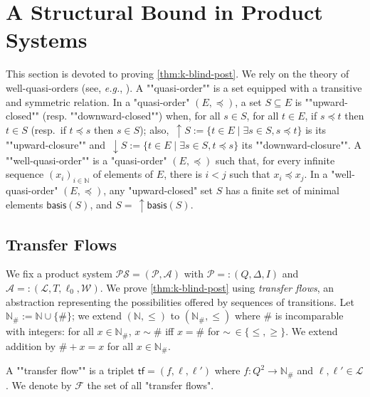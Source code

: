 \documentclass[10pt,a4paper]{article}
\let\mathbb\mathds
\renewcommand{\geq}{\geqslant}
\renewcommand{\leq}{\leqslant}
\newcommand{\nats}{\mathbb{N}}
\newcommand{\set}[1]{\{#1\}}
\newcommand{\deff}{:=}
\newcommand{\prot}{\mathcal{P}}
\newcommand{\initialstates}{I}
\newcommand{\transitions}{\Delta}
\newcommand*{\states}{Q}
\newcommand*{\buchiaut}{\mathcal{A}}
\newcommand{\bstates}{\mathcal{L}}
\newcommand{\btransitions}{T}
\newcommand*{\abuchistate}{\ell}
\newcommand*{\bstate}{\abuchistate}
\newcommand*{\binitstate}{\bstate_0}
\newcommand*{\bwinning}{\mathcal{W}}
\newcommand{\prodsystem}{\mathcal{PS}}
\newcommand*{\lewqo}{\preceq}
\let\olduparrow\uparrow
\renewcommand*{\uparrow}{{\,\olduparrow}}
\let\olddownarrow\downarrow
\renewcommand*{\downarrow}{{\,\olddownarrow}}
\newcommand*{\downwardclosure}[1]{\downarrow #1}
\newcommand*{\upwardclosure}[1]{\uparrow #1}
\newcommand*{\dummysymb}{\#}
\newcommand*{\natsanddummy}{\nats_{\dummysymb}}
\newcommand*{\transferflows}{\mathcal{F}}
\newcommand*{\minwqo}[1]{\mathsf{basis}(#1)}
\newcommand*{\atf}{\mathsf{tf}}
\begin{document}
%
%
\section{A Structural Bound in Product Systems}
\label{sec:structural-bounds}

%
%
%
%

%
%
This section is devoted to proving \cref{thm:k-blind-post}.
We rely on the theory of well-quasi-orders (see, \emph{e.g.}, \cite{WQOlecturenotes}).
%
A \AP ""quasi-order"" is a set equipped with a transitive and symmetric relation.
In a "quasi-order" \((E,\lewqo)\), a set \(S \subseteq E\) is \AP ""upward-closed"" (resp.
""downward-closed"") when, for all \(s \in S\), for all \(t \in E\), if \(s \lewqo t\) then \(t \in S\) (resp.\ if \(t \lewqo s\) then \(s \in S\)); also, \(\upwardclosure{S} \deff \set{t \in E \mid \exists s \in S, s \lewqo t}\) is its ""upward-closure"" and \(\downwardclosure{S} \deff \set{t \in E \mid \exists s \in S, t \lewqo s}\) its  ""downward-closure"".
A \AP ""well-quasi-order"" is a "quasi-order" \((E,\lewqo)\) such that, for every infinite sequence \((x_i)_{i \in \nats}\) of elements of \(E\), there is \(i <j\) such that \(x_i \lewqo x_j\).
In a "well-quasi-order" \((E, \lewqo)\), any "upward-closed" set \(S\) has a finite set of minimal elements \(\minwqo{S}\), and \(S = \upwardclosure{\minwqo{S}}\).
%

%
\subsection{Transfer Flows}
%
We fix a product system \(\prodsystem = (\prot, \buchiaut)\) with \(\prot =: (\states, \transitions, \initialstates)\) and \(\buchiaut =: (\bstates, \btransitions, \binitstate, \bwinning)\).
%
%
%
%
We prove \cref{thm:k-blind-post} using \emph{transfer flows}, an abstraction representing the possibilities offered by sequences of transitions.
Let \(\natsanddummy \deff \nats \cup \set{\dummysymb}\); we extend \((\nats,\leq)\) to \((\natsanddummy,\leq)\) where \(\dummysymb\) is incomparable with integers: for all \(x \in \natsanddummy\), \(x \sim \dummysymb\) iff \(x = \dummysymb\) for \(\sim \, \in \set{\leq,\geq}\).
%
We extend addition by \(\dummysymb + x = x\) for all \(x \in \natsanddummy\).

\begin{definition}
	A ""transfer flow"" is a triplet \(\atf = (f,\abuchistate,\abuchistate')\) where \(f : \states^2 \to \natsanddummy\) and \(\abuchistate, \abuchistate' \in \bstates\).
	We denote by \(\transferflows\) the set of all "transfer flows".
\end{definition}
\end{document}
